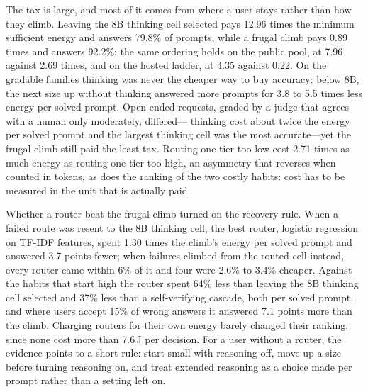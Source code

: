 \documentclass[final,5p,times,twocolumn]{elsarticle}
\theoremstyle{plain}
\begin{document}
The tax is large, and most of it comes from where a user stays rather than
how they climb. Leaving the 8B thinking cell selected pays 12.96 times the
minimum sufficient energy and answers 79.8\% of prompts, while a frugal climb
pays 0.89 times and answers 92.2\%; the same ordering holds on the public
pool, at 7.96 against 2.69 times, and on the hosted ladder, at 4.35 against
0.22. On the gradable families thinking was never the cheaper way to buy
accuracy: below 8B, the next size up without thinking answered more prompts
for 3.8 to 5.5 times less energy per solved prompt. Open-ended requests,
graded by a judge that agrees with a human only moderately, differed---
thinking cost about twice the energy per solved prompt and the largest
thinking cell was the most accurate---yet the frugal climb still paid the
least tax. Routing one tier too low cost 2.71 times as much energy as routing
one tier too high, an asymmetry that reverses when counted in tokens, as does
the ranking of the two costly habits: cost has to be measured in the unit
that is actually paid.

Whether a router beat the frugal climb turned on the recovery rule. When a
failed route was resent to the 8B thinking cell, the best router, logistic
regression on TF-IDF features, spent 1.30 times the climb's energy per solved
prompt and answered 3.7 points fewer; when failures climbed from the routed
cell instead, every router came within 6\% of it and four were 2.6\% to 3.4\%
cheaper. Against the habits that start high the router spent 64\% less than
leaving the 8B thinking cell selected and 37\% less than a self-verifying
cascade, both per solved prompt, and where users accept 15\% of wrong answers
it answered 7.1 points more than the climb. Charging routers for their own
energy barely changed their ranking, since none cost more than 7.6\,J per
decision. For a user without a router, the evidence points to a short rule:
start small with reasoning off, move up a size before turning reasoning on,
and treat extended reasoning as a choice made per prompt rather than a
setting left on.
\end{document}
